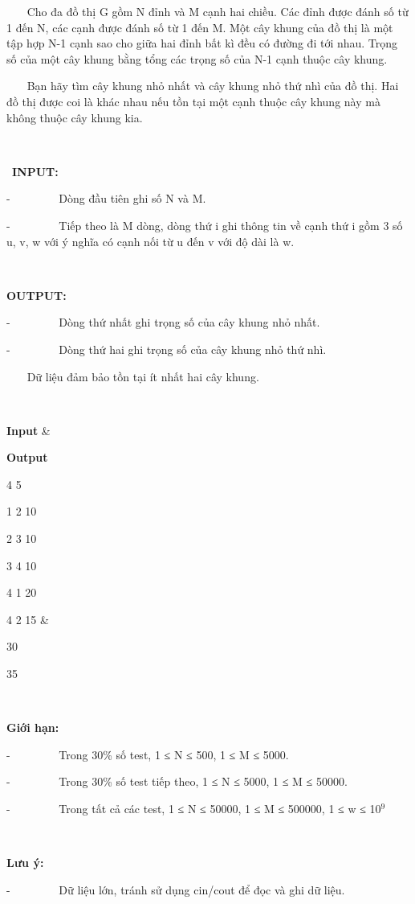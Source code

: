 

    Cho đa đồ thị G gồm N đỉnh và M cạnh hai chiều. Các đỉnh được  đánh số từ 1 đến N, các cạnh được đánh số từ 1 đến M. Một cây khung của  đồ thị là một tập hợp N-1 cạnh sao cho giữa hai đỉnh bất kì đều có đường  đi tới nhau. Trọng số của một cây khung bằng tổng các trọng số của N-1  cạnh thuộc cây khung.

    Bạn hãy tìm cây khung nhỏ nhất và cây khung nhỏ thứ nhì của đồ  thị. Hai đồ thị được coi là khác nhau nếu tồn tại một cạnh thuộc cây  khung này mà không thuộc cây khung kia.

 

 \textbf{INPUT: }

-         Dòng đầu tiên ghi số N và M.

-         Tiếp theo là M dòng, dòng thứ i ghi thông tin về cạnh thứ i  gồm 3 số u, v, w với ý nghĩa có cạnh nối từ u đến v với độ dài là w.

 

\textbf{OUTPUT:}

-         Dòng thứ nhất ghi trọng số của cây khung nhỏ nhất.

-         Dòng thứ hai ghi trọng số của cây khung nhỏ thứ nhì.

    Dữ liệu đảm bảo tồn tại ít nhất hai cây khung.

 
\begin{tabular}\hline 


\textbf{Input} & 

\textbf{Output}  
\hline


4 5

1 2 10

2 3 10

3 4 10

4 1 20

4 2 15 & 

30

35  
\hline

\end{tabular}

 

\textbf{Giới hạn: }

-         Trong 30\% số test, 1 ≤ N ≤ 500, 1 ≤ M ≤ 5000.

-         Trong 30\% số test tiếp theo, 1 ≤ N ≤ 5000, 1 ≤ M ≤ 50000.

-         Trong tất cả các test, 1 ≤ N ≤ 50000, 1 ≤ M ≤ 500000, 1 ≤ w ≤ 10$^9$

 

\textbf{Lưu ý:}

-         Dữ liệu lớn, tránh sử dụng cin/cout để đọc và ghi dữ liệu.

 
